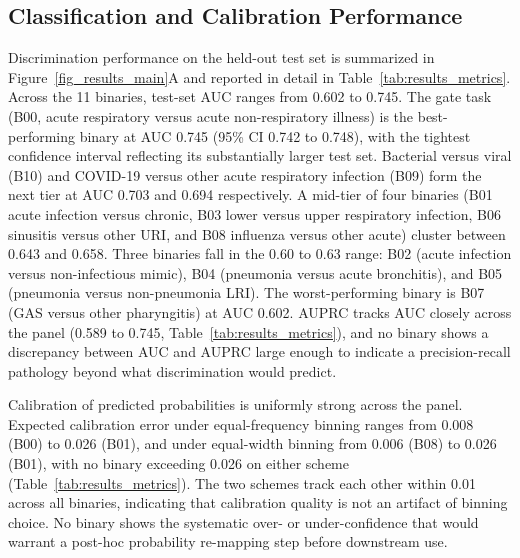 \documentclass[utf8]{FrontiersinHarvard} %
\begin{document}
\subsection{Classification and Calibration Performance}
\label{sec:results-discrimination}
\label{sec:results-calibration}
\label{sec:results-threshold}

Discrimination performance on the held-out test set is summarized in Figure~\ref{fig_results_main}A and reported in detail in Table~\ref{tab:results_metrics}. Across the 11 binaries, test-set AUC ranges from 0.602 to 0.745. The gate task (B00, acute respiratory versus acute non-respiratory illness) is the best-performing binary at AUC 0.745 (95\% CI 0.742 to 0.748), with the tightest confidence interval reflecting its substantially larger test set. Bacterial versus viral (B10) and COVID-19 versus other acute respiratory infection (B09) form the next tier at AUC 0.703 and 0.694 respectively. A mid-tier of four binaries (B01 acute infection versus chronic, B03 lower versus upper respiratory infection, B06 sinusitis versus other URI, and B08 influenza versus other acute) cluster between 0.643 and 0.658. Three binaries fall in the 0.60 to 0.63 range: B02 (acute infection versus non-infectious mimic), B04 (pneumonia versus acute bronchitis), and B05 (pneumonia versus non-pneumonia LRI). The worst-performing binary is B07 (GAS versus other pharyngitis) at AUC 0.602. AUPRC tracks AUC closely across the panel (0.589 to 0.745, Table~\ref{tab:results_metrics}), and no binary shows a discrepancy between AUC and AUPRC large enough to indicate a precision-recall pathology beyond what discrimination would predict.

Calibration of predicted probabilities is uniformly strong across the panel. Expected calibration error under equal-frequency binning ranges from 0.008 (B00) to 0.026 (B01), and under equal-width binning from 0.006 (B08) to 0.026 (B01), with no binary exceeding 0.026 on either scheme (Table~\ref{tab:results_metrics}). The two schemes track each other within 0.01 across all binaries, indicating that calibration quality is not an artifact of binning choice. No binary shows the systematic over- or under-confidence that would warrant a post-hoc probability re-mapping step before downstream use.
\end{document}
